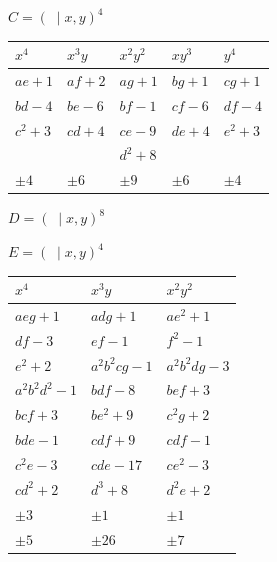 \documentclass[11pt]{article}
\begin{document}
\begin{center}
$C=(\;\mid x,y)^{4}$

\medskip
\begin{tabular}{|l|l|l|l|l|}
\hline
$x^{4}$ & $x^{3}y$ & $x^{2}y^{2}$ & $xy^{3}$ & $y^{4}$\\
\hline
$ae+1$ & $af+2$ & $ag+1$ & $bg+1$ & $cg+1$\\
$bd-4$ & $be-6$ & $bf-1$ & $cf-6$ & $df-4$\\
$c^{2}+3$ & $cd+4$ & $ce-9$ & $de+4$ & $e^{2}+3$\\
& & $d^{2}+8$ & & \\
\hline
$\pm 4$ & $\pm 6$ & $\pm 9$ & $\pm 6$ & $\pm 4$\\
\hline
\end{tabular}

\bigskip
$D=(\;\mid x,y)^{8}$

\medskip
{}

\bigskip
$E=(\;\mid x,y)^{4}$

\medskip
\begin{tabular}{|l|l|l|}
\hline
$x^{4}$ & $x^{3}y$ & $x^{2}y^{2}$\\
\hline
$aeg+1$ & $adg+1$ & $ae^{2}+1$\\
$df-3$ & $ef-1$ & $f^{2}-1$\\
$e^{2}+2$ & $a^{2}b^{2}cg-1$ & $a^{2}b^{2}dg-3$\\
$a^{2}b^{2}d^{2}-1$ & $bdf-8$ & $bef+3$\\
$bcf+3$ & $be^{2}+9$ & $c^{2}g+2$\\
$bde-1$ & $cdf+9$ & $cdf-1$\\
$c^{2}e-3$ & $cde-17$ & $ce^{2}-3$\\
$cd^{2}+2$ & $d^{3}+8$ & $d^{2}e+2$\\
\hline
$\pm 3$ & $\pm 1$ & $\pm 1$\\
$\pm 5$ & $\pm 26$ & $\pm 7$\\
\hline
\end{tabular}


\end{center}
\end{document}
